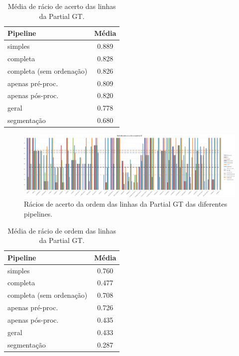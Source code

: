 \begin{table}[H]
	\centering
	\begin{tabular}{|l|c|}
		\hline
		\textbf{Pipeline} & \textbf{Média} \\ \hline
		simples & 0.889 				   \\ \hline
		completa & 0.828 				   \\ \hline
		completa (sem ordenação) & 0.826   \\ \hline
		apenas pré-proc. & 0.809 		   \\ \hline
		apenas pós-proc. & 0.820 		   \\ \hline
		geral & 0.778 					   \\ \hline
		segmentação & 0.680 			   \\ \hline
	\end{tabular}
	\caption{Média de rácio de acerto das linhas da Partial GT.}
\end{table}



\begin{figure}[H]
	\centering
	\hspace*{-2cm}
	\includegraphics[width=1.1\textwidth]{images/resultados/graph_pgt_correct_order_ratio.png}
	\caption{Rácios de acerto da ordem das linhas da Partial GT das diferentes pipelines.}
	\label{fig:graph_pgt_correct_order_ratio}
\end{figure}


\begin{table}[H]
	\centering
	\begin{tabular}{|l|c|}
		\hline
		\textbf{Pipeline} & \textbf{Média} \\ \hline
		simples & 0.760 				   \\ \hline
		completa & 0.477 				   \\ \hline
		completa (sem ordenação) & 0.708   \\ \hline
		apenas pré-proc. & 0.726 		   \\ \hline
		apenas pós-proc. & 0.435 		   \\ \hline
		geral & 0.433 					   \\ \hline
		segmentação & 0.287 			   \\ \hline
	\end{tabular}
	\caption{Média de rácio de ordem das linhas da Partial GT.}
\end{table}



